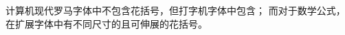 \documentclass{book}
\begin{document}
计算机现代罗马字体中不包含花括号，但打字机字体中包含；
而对于数学公式，在扩展字体中有不同尺寸的\ldash 且可伸展的\rdash 花括号。

\endofchapter
\end{document}
